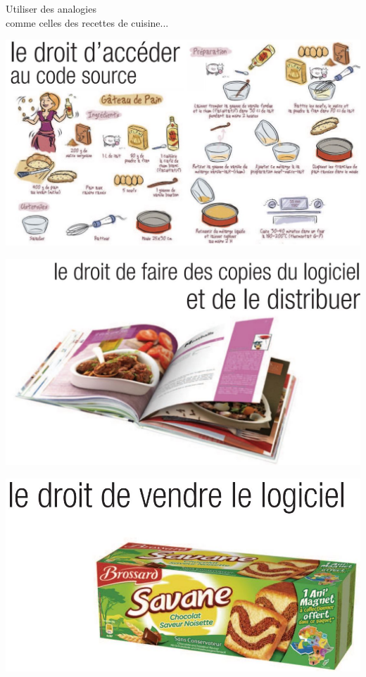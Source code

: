 \documentclass{beamer}
\begin{document}
\begin{frame}
\begin{center}
\Huge{Utiliser des analogies \\comme celles des recettes de cuisine...}
\end{center}
\end{frame}

\begin{frame}
\includegraphics[scale=0.6] {./images/Cuisine01.jpg} 
\end{frame}
\begin{frame}
\includegraphics[scale=0.5] {./images/Cuisine02.jpg} 
\end{frame}
\begin{frame}
\includegraphics[scale=0.6] {./images/Cuisine03.jpg} 
\end{frame}
\end{document}
